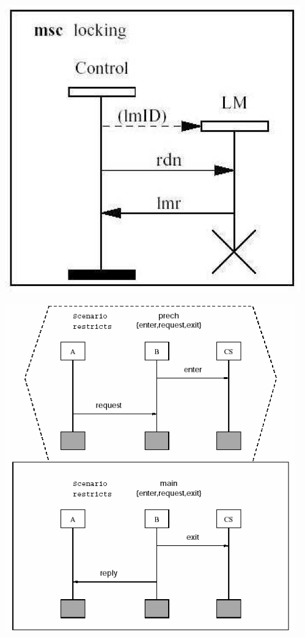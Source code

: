 \documentclass[]{article}
\begin{document}
\begin{center}
	\includegraphics[scale=0.4]{DynCD.png}
\end{center}

\begin{center}
	\includegraphics[scale=0.4]{Trigger.png}
\end{center}
\end{document}
